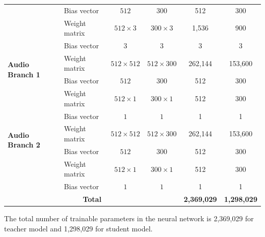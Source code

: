 \documentclass{ioereport}
\begin{document}
\begin{table}[H]
{\begin{tabular}{|p{6em}|l|c|c|c|c|}
                                  & Bias vector                     & $512$               & $300$               & 512                 & 300                 \\
                                  & Weight matrix                   & $512 \times 3$      & $300 \times 3$      & 1,536               & 900                 \\
                                  & Bias vector                     & $3$                 & $3$                 & 3                   & 3                   \\ \hline
    \multirow{2}{5em}{\textbf{Audio Branch 1}}       & Weight matrix                   & $512 \times 512$    & $512 \times 300$    & 262,144             & 153,600             \\
                                  & Bias vector                     & $512$               & $300$               & 512                 & 300                 \\
                                  & Weight matrix                   & $512 \times 1$      & $300 \times 1$      & 512                 & 300                 \\
                                  & Bias vector                     & $1$                 & $1$                 & 1                   & 1                   \\ \hline
    \multirow{2}{5em}{\textbf{Audio Branch 2}}       & Weight matrix                   & $512 \times 512$    & $512 \times 300$    & 262,144             & 153,600             \\
                                  & Bias vector                     & $512$               & $300$               & 512                 & 300                 \\
                                  & Weight matrix                   & $512 \times 1$      & $300 \times 1$      & 512                 & 300                 \\
                                  & Bias vector                     & $1$                 & $1$                 & 1                   & 1                   \\ \hline
    \multicolumn{4}{|c|}{\textbf{Total}}  & \textbf{2,369,029}  & \textbf{1,298,029} \\ \hline
    \end{tabular}
    }
\end{table}


The total number of trainable parameters in the neural network is 2,369,029 for teacher model and 1,298,029 for student model.
\end{document}
